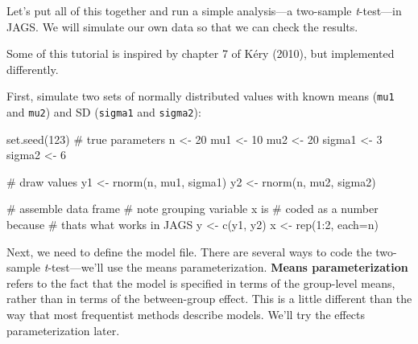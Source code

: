 \documentclass[
  13,
  letterpaper,
]{report}
\newenvironment{Shaded}{\begin{snugshade}}{\end{snugshade}}
\newcommand{\AttributeTok}[1]{\textcolor[rgb]{0.40,0.45,0.13}{#1}}
\newcommand{\CommentTok}[1]{\textcolor[rgb]{0.37,0.37,0.37}{#1}}
\newcommand{\DecValTok}[1]{\textcolor[rgb]{0.68,0.00,0.00}{#1}}
\newcommand{\FunctionTok}[1]{\textcolor[rgb]{0.28,0.35,0.67}{#1}}
\newcommand{\NormalTok}[1]{\textcolor[rgb]{0.00,0.23,0.31}{#1}}
\newcommand{\OtherTok}[1]{\textcolor[rgb]{0.00,0.23,0.31}{#1}}
\newcommand{\SpecialCharTok}[1]{\textcolor[rgb]{0.37,0.37,0.37}{#1}}
\begin{document}
Let's put all of this together and run a simple analysis---a two-sample
\emph{t}-test---in JAGS. We will simulate our own data so that we can
check the results.

Some of this tutorial is inspired by chapter 7 of Kéry (2010), but
implemented differently.

First, simulate two sets of normally distributed values with known means
(\texttt{mu1} and \texttt{mu2}) and SD (\texttt{sigma1} and
\texttt{sigma2}):

\begin{Shaded}
\begin{Highlighting}[]
\FunctionTok{set.seed}\NormalTok{(}\DecValTok{123}\NormalTok{)}
\CommentTok{\# true parameters}
\NormalTok{n }\OtherTok{\textless{}{-}} \DecValTok{20}
\NormalTok{mu1 }\OtherTok{\textless{}{-}} \DecValTok{10}
\NormalTok{mu2 }\OtherTok{\textless{}{-}} \DecValTok{20}
\NormalTok{sigma1 }\OtherTok{\textless{}{-}} \DecValTok{3}
\NormalTok{sigma2 }\OtherTok{\textless{}{-}} \DecValTok{6}

\CommentTok{\# draw values}
\NormalTok{y1 }\OtherTok{\textless{}{-}} \FunctionTok{rnorm}\NormalTok{(n, mu1, sigma1)}
\NormalTok{y2 }\OtherTok{\textless{}{-}} \FunctionTok{rnorm}\NormalTok{(n, mu2, sigma2)}

\CommentTok{\# assemble data frame}
\CommentTok{\# note grouping variable x is }
\CommentTok{\# coded as a number because}
\CommentTok{\# that\textquotesingle{}s what works in JAGS}
\NormalTok{y }\OtherTok{\textless{}{-}} \FunctionTok{c}\NormalTok{(y1, y2)}
\NormalTok{x }\OtherTok{\textless{}{-}} \FunctionTok{rep}\NormalTok{(}\DecValTok{1}\SpecialCharTok{:}\DecValTok{2}\NormalTok{, }\AttributeTok{each=}\NormalTok{n)}
\end{Highlighting}
\end{Shaded}

Next, we need to define the model file. There are several ways to code
the two-sample \emph{t}-test---we'll use the means parameterization.
\textbf{Means parameterization} refers to the fact that the model is
specified in terms of the group-level means, rather than in terms of the
between-group effect. This is a little different than the way that most
frequentist methods describe models. We'll try the effects
parameterization later.
\end{document}
